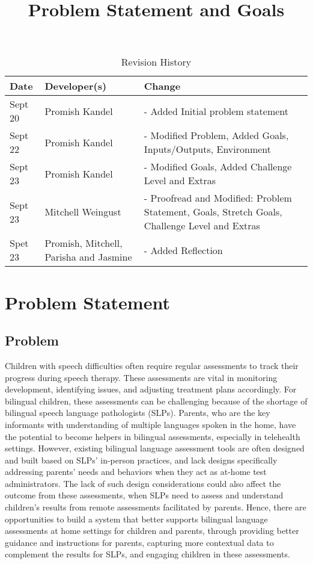 \documentclass{article}
\title{Problem Statement and Goals\\\progname}
\author{\authname}
\date{}
\begin{document}
\maketitle

\begin{table}[hp]
\caption{Revision History} \label{TblRevisionHistory}
\begin{tabularx}{\textwidth}{llX}
\toprule
\textbf{Date} & \textbf{Developer(s)} & \textbf{Change}\\
\midrule
Sept 20 & Promish Kandel& - Added Initial problem statement\\
Sept 22 & Promish Kandel & - Modified Problem, Added Goals, Inputs/Outputs, Environment\\
Sept 23 & Promish Kandel & - Modified Goals, Added Challenge Level and Extras\\
Sept 23 & Mitchell Weingust & - Proofread and Modified: Problem Statement, Goals, Stretch Goals, Challenge Level and Extras\\
Spet 23 & Promish, Mitchell, Parisha and Jasmine & - Added Reflection\\
\bottomrule
\end{tabularx}
\end{table}

\section{Problem Statement}
\subsection{Problem}
\hspace{2em}Children with speech difficulties often require regular assessments to track their progress
during speech therapy. These assessments are vital in monitoring development, identifying issues, and
adjusting treatment plans accordingly. For bilingual children, these assessments can be challenging
because of the shortage of bilingual  speech language pathologists (SLPs).  Parents, who are the key
informants with understanding of multiple languages spoken in the home, have the potential to become
helpers in bilingual assessments, especially in telehealth settings. However, existing bilingual language
assessment tools are often designed and built based on SLPs’ in-person practices, and lack designs
specifically addressing parents’ needs and behaviors when they act as at-home test administrators. The lack of such design
considerations could also affect the outcome from these assessments, when SLPs need to assess and understand
children’s results from remote assessments facilitated by parents. Hence, there are opportunities to build a
system that better supports bilingual language assessments at home settings for children and parents, through
providing better guidance and instructions for parents, capturing more contextual data to complement the
results for SLPs, and engaging children in these assessments.
\end{document}
